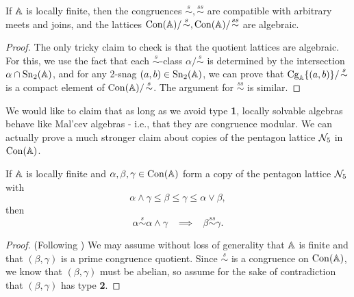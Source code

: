 \begin{appendices}
\begin{prop}\label{prop-solvable-quotient-algebraic} If $\mathbb{A}$ is locally finite, then the congruences $\stackrel{s}{\sim}, \stackrel{ss}{\sim}$ are compatible with arbitrary meets and joins, and the lattices $\operatorname{Con}(\mathbb{A})/\!\stackrel{s}{\sim}, \operatorname{Con}(\mathbb{A})/\!\stackrel{ss}{\sim}$ are algebraic.
\end{prop}
\begin{proof} The only tricky claim to check is that the quotient lattices are algebraic. For this, we use the fact that each $\stackrel{s}{\sim}$-class $\alpha/\!\stackrel{s}{\sim}$ is determined by the intersection $\alpha \cap \operatorname{Sn}_2(\mathbb{A})$, and for any 2-snag $(a,b) \in \operatorname{Sn}_2(\mathbb{A})$, we can prove that $\operatorname{Cg}_{\mathbb{A}}\{(a,b)\}/\!\stackrel{s}{\sim}$ is a compact element of $\operatorname{Con}(\mathbb{A})/\!\stackrel{s}{\sim}$. The argument for $\stackrel{ss}{\sim}$ is similar.
\end{proof}

We would like to claim that as long as we avoid type \textbf{1}, locally solvable algebras behave like Mal'cev algebras - i.e., that they are congruence modular. We can actually prove a much stronger claim about copies of the pentagon lattice $\mathcal{N}_5$ in $\operatorname{Con}(\mathbb{A})$.

\begin{center}
\end{center}

\begin{thm} If $\mathbb{A}$ is locally finite and $\alpha, \beta, \gamma \in \operatorname{Con}(\mathbb{A})$ form a copy of the pentagon lattice $\mathcal{N}_5$ with
\[
\alpha \wedge \gamma \le \beta \le \gamma \le \alpha \vee \beta,
\]
then
\[
\alpha \stackrel{s}{\sim} \alpha \wedge \gamma \;\;\; \implies \;\;\; \beta \stackrel{ss}{\sim} \gamma.
\]
\end{thm}
\begin{proof} (Following \cite{hobby-mckenzie}) We may assume without loss of generality that $\mathbb{A}$ is finite and that $(\beta, \gamma)$ is a prime congruence quotient. Since $\stackrel{s}{\sim}$ is a congruence on $\operatorname{Con}(\mathbb{A})$, we know that $(\beta,\gamma)$ must be abelian, so assume for the sake of contradiction that $(\beta, \gamma)$ has type \textbf{2}.


\end{proof}
\end{appendices}

